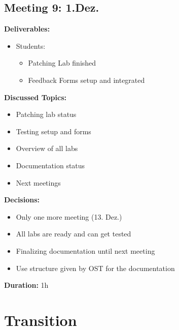 \subsection*{Meeting 9: 1.Dez.}
\textbf{Deliverables:}
\begin{itemize}
    \item Students:
    \begin{itemize}
        \item Patching Lab finished 
        \item Feedback Forms setup and integrated
    \end{itemize}
\end{itemize} 
\textbf{Discussed Topics:}
\begin{itemize}
    \item Patching lab status 
    \item Testing setup and forms
    \item Overview of all labs
    \item Documentation status
    \item Next meetings
\end{itemize}
\textbf{Decisions:}
\begin{itemize}
    \item Only one more meeting (13. Dez.)
    \item All labs are ready and can get tested
    \item Finalizing documentation until next meeting
    \item Use structure given by OST for the documentation
\end{itemize}
\textbf{Duration:} 1h

\section{Transition}
